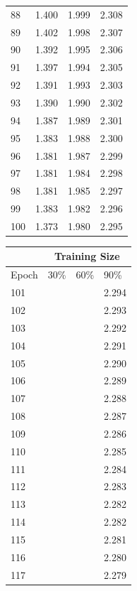 \documentclass[12pt]{article}
\begin{document}
\begin{center}
\begin{tabular}{|l || l| l| l|}
            88 & 1.400 & 1.999 & 2.308 \\
            89 & 1.402 & 1.998 & 2.307 \\
            90 & 1.392 & 1.995 & 2.306 \\
            91 & 1.397 & 1.994 & 2.305 \\
            92 & 1.391 & 1.993 & 2.303 \\
            93 & 1.390 & 1.990 & 2.302 \\
            94 & 1.387 & 1.989 & 2.301 \\
            95 & 1.383 & 1.988 & 2.300 \\
            96 & 1.381 & 1.987 & 2.299 \\
            97 & 1.381 & 1.984 & 2.298 \\
            98 & 1.381 & 1.985 & 2.297 \\
            99 & 1.383 & 1.982 & 2.296 \\
            100 & 1.373 & 1.980 & 2.295 \\
            \hline
          \end{tabular}
          \begin{tabular}{|l || l| l| l|}
            \hline
            &\multicolumn{3}{|c|}{Training Size} \\
            \hline
            Epoch & 30\% & 60\% & 90\% \\
            \hline
            101 & & & 2.294 \\
            102 & & & 2.293 \\
            103 & & & 2.292 \\
            104 & & & 2.291 \\
            105 & & & 2.290 \\
            106 & & & 2.289 \\
            107 & & & 2.288 \\
            108 & & & 2.287 \\
            109 & & & 2.286 \\
            110 & & & 2.285 \\
            111 & & & 2.284 \\
            112 & & & 2.283 \\
            113 & & & 2.282 \\
            114 & & & 2.282 \\
            115 & & & 2.281 \\
            116 & & & 2.280 \\
            117 & & & 2.279 \\

\end{tabular}
\end{center}
\end{document}
